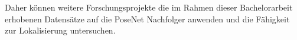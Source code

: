 
Daher können weitere Forschungsprojekte die im Rahmen dieser Bachelorarbeit erhobenen Datensätze auf die PoseNet Nachfolger \cite{kendallModellingUncertaintyDeep2016, walchImageBasedLocalizationUsing2017, clarkVidLocDeepSpatioTemporal2017} anwenden und die Fähigkeit zur Lokalisierung untersuchen.